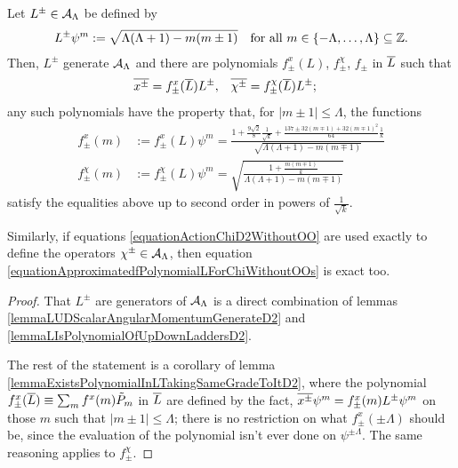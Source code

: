 \begin{proposition}\label{propositionThereAreFunctionsfpmD2}
Let $L^\pm \in \mathcal A_{\Lambda}$ be defined by
\begin{align}
    L^\pm \psi^m &:= \sqrt{\Lambda(\Lambda + 1) - m(m \pm 1)}& \text{for all }m \in \{-\Lambda, \dots, \Lambda\}\subseteq \mathbb{Z}.
\end{align}
Then, $L^\pm$ generate $\mathcal A_\Lambda$ and there are polynomials $f^x_\pm(L)$, $f^\chi_\pm$, $f_\pm$ in $\overline{L}$ such that
\begin{align}
    \overline{x^\pm} &= f^x_{\pm}(\overline{L}) L^\pm,&
    \overline{\chi^\pm} &= f^\chi_{\pm}(\overline{L}) L^\pm;
\end{align}
any such polynomials have the property that, for $|m \pm 1| \leq \Lambda$, the functions
\begin{align}\label{equationApproximatedfPolynomialLForVanillaX}
    f^x_\pm(m) &:= f^x_\pm(L)\psi^m = \frac{1 + \frac{9\sqrt{2}}{8}\frac{1}{\sqrt{k}} + \frac{137 \pm 32(m \mp 1) + 32(m \mp 1)^2}{64}\frac{1}{k}}{\sqrt{\Lambda(\Lambda+1) - m(m \mp 1)}}\\
    \label{equationApproximatedfPolynomialLForChiWithoutOOs}
    f^\chi_\pm(m)&:= f^\chi_\pm(L)\psi^m = \sqrt{\frac{1 + \frac{m(m\mp 1)}{k}}{\Lambda(\Lambda+1) - m(m \mp 1)}}
\end{align}
satisfy the equalities above up to second order in powers of $\frac{1}{\sqrt{k}}$. 

Similarly, if equations \eqref{equationActionChiD2WithoutOO} are used exactly to define the operators $\chi^\pm \in \mathcal A_\Lambda$, then equation \eqref{equationApproximatedfPolynomialLForChiWithoutOOs} is exact too.
\end{proposition}
\begin{proof}
That $L^\pm$ are generators of $\mathcal A_\Lambda$ is a direct combination of lemmas \ref{lemmaLUDScalarAngularMomentumGenerateD2} and \ref{lemmaLIsPolynomialOfUpDownLaddersD2}.

The rest of the statement is a corollary of lemma \ref{lemmaExistsPolynomialInLTakingSameGradeToItD2}, where the polynomial $f^x_\pm(\overline{L})  \equiv \sum_m f^x(m) \tilde P_m$ in $\overline{L}$ are defined by the fact, $\overline{x^\pm} \psi^m = f^x_\pm(m) L^\pm \psi^m$ on those $m$ such that $|m \pm 1| \leq \Lambda$; there is no restriction on what $f^x_\pm(\pm \Lambda)$ should be, since the evaluation of the polynomial isn't ever done on $\psi^{\pm \Lambda}$. The same reasoning applies to $f^\chi_\pm$.
\end{proof}

